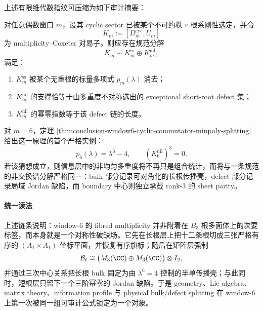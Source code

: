\noindent
上述有限维代数指纹可压缩为如下审计摘要：


\begin{conjecture}\label{conj:conclusion-window6-evenwindow-bulk-defect-universality}
对任意偶数窗口 \(m\)，设其 cyclic sector 已被某个不可约秩 \(r\) 根系刚性选定，并令
\[
K_m:=[D_m^{\mathrm{cyc}},U_m]
\]
为 multiplicity--Coxeter 对易子。则应存在规范分解
\[
K_m\sim K_m^{\mathrm{ss}}\oplus K_m^{\mathrm{nil}},
\]
满足：
\begin{enumerate}
  \item \(K_m^{\mathrm{ss}}\) 被某个无重根的标量多项式 \(p_m(\lambda)\) 消去；
  \item \(K_m^{\mathrm{nil}}\) 的支撑恰等于由多重度不对称选出的 exceptional short-root defect 集；
  \item \(K_m^{\mathrm{nil}}\) 的幂零指数等于该 defect 链的长度。
\end{enumerate}
对 \(m=6\)，定理 \ref{thm:conclusion-window6-cyclic-commutator-minpoly-splitting} 给出这一原理的首个严格实例：
\[
p_6(\lambda)=\lambda^6-4,
\qquad
(K_6^{\mathrm{nil}})^3=0.
\]
若该猜想成立，则信息层中的非均匀多重度将不再只是组合统计，而将与一条规范的非交换谱分解严格同一：bulk 部分记录可对角化的长根传播壳，defect 部分记录局域 Jordan 缺陷，而 boundary 中心则独立承载 rank-\(3\) 的 sheet parity。
\end{conjecture}

\paragraph{统一读法}
上述链条说明：window-\(6\) 的 fibred multiplicity 并非附着在 \(B_3\) 根多面体上的次要标签，而本身就是一个对称性破缺场。它先在长根层上把十二条根切成三张严格有序的 \((A_1\times A_1)\) 坐标平面，并恢复有序旗标；随后在矩阵层强制
\[
\mathcal B_{\ell}\cong \bigl(M_3(\CC)\oplus M_3(\CC)\bigr)\otimes I_2,
\]
并通过三次中心关系把长根 bulk 固定为由 \(\lambda^6=4\) 控制的半单传播壳；与此同时，短根层只留下一个三阶幂零的 Jordan 缺陷。于是 geometry、Lie algebra、matrix theory、information profile 与 physical bulk/defect splitting 在 window-\(6\) 上第一次被同一组可审计公式锁定为一个对象。

\endinput
